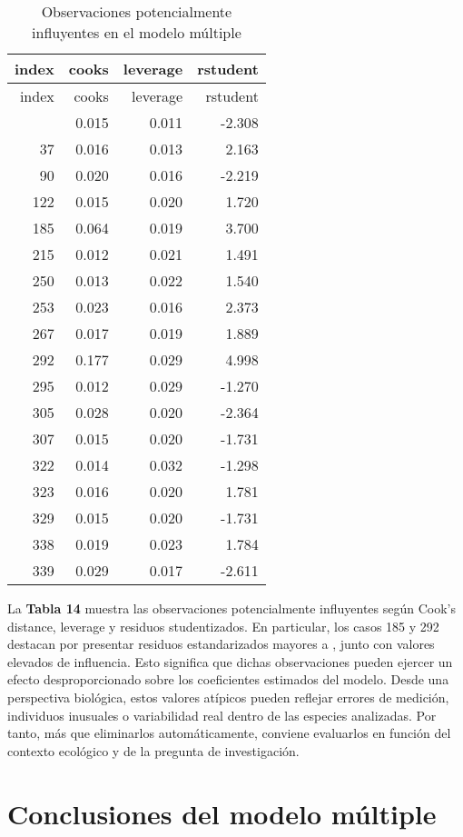 \documentclass[
  spanish,
  11pt,
  a4paper,
  DIV=11,
  numbers=noendperiod]{scrartcl}
\begin{document}
\begin{longtable}[]{@{}rrrr@{}}
\caption{Observaciones potencialmente influyentes en el modelo
múltiple}\tabularnewline
\toprule\noalign{}
index & cooks & leverage & rstudent \\
\midrule\noalign{}
\endfirsthead
\toprule\noalign{}
index & cooks & leverage & rstudent \\
\midrule\noalign{}
\endhead
\bottomrule\noalign{}
\endlastfoot
14 & 0.015 & 0.011 & -2.308 \\
37 & 0.016 & 0.013 & 2.163 \\
90 & 0.020 & 0.016 & -2.219 \\
122 & 0.015 & 0.020 & 1.720 \\
185 & 0.064 & 0.019 & 3.700 \\
215 & 0.012 & 0.021 & 1.491 \\
250 & 0.013 & 0.022 & 1.540 \\
253 & 0.023 & 0.016 & 2.373 \\
267 & 0.017 & 0.019 & 1.889 \\
292 & 0.177 & 0.029 & 4.998 \\
295 & 0.012 & 0.029 & -1.270 \\
305 & 0.028 & 0.020 & -2.364 \\
307 & 0.015 & 0.020 & -1.731 \\
322 & 0.014 & 0.032 & -1.298 \\
323 & 0.016 & 0.020 & 1.781 \\
329 & 0.015 & 0.020 & -1.731 \\
338 & 0.019 & 0.023 & 1.784 \\
339 & 0.029 & 0.017 & -2.611 \\
\end{longtable}

La \textbf{Tabla 14} muestra las observaciones potencialmente
influyentes según Cook's distance, leverage y residuos studentizados. En
particular, los casos 185 y 292 destacan por presentar residuos
estandarizados mayores a \textbar, junto con valores elevados
de influencia. Esto significa que dichas observaciones pueden ejercer un
efecto desproporcionado sobre los coeficientes estimados del modelo.
Desde una perspectiva biológica, estos valores atípicos pueden reflejar
errores de medición, individuos inusuales o variabilidad real dentro de
las especies analizadas. Por tanto, más que eliminarlos automáticamente,
conviene evaluarlos en función del contexto ecológico y de la pregunta
de investigación.

\section{Conclusiones del modelo
múltiple}\label{conclusiones-del-modelo-muxfaltiple}
\end{document}
